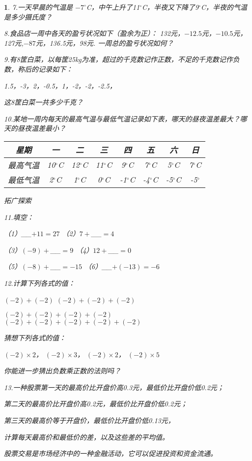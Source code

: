 \documentclass{article}
\newtheorem{exercise}{ }
\begin{document}
\begin{exercise}
7.一天早晨的气温是 ${-7}^\circ$C，中午上升了11$^\circ$C，半夜又下降了9$^\circ$C，半夜的气温是多少摄氏度？

8.食品店一周中各天的盈亏状况如下（盈余为正）：
	132元，${-12.5}$元，${-10.5}$元，127元,${-87}$元，136.5元，98元.
一周总的盈亏状况如何？

9.有8筐白菜，以每筐25kg为准，超过的千克数记作正数，不足的千克数记作负数，称后的记录如下：

1.5，-3，2，-0.5，1，-2，-2，-2.5，

这8筐白菜一共多少千克？

10.某地一周内每天的最高气温与最低气温记录如下表，哪天的昼夜温差最大？哪天的昼夜温差最小？

\begin{tabular}{|c|c|c|c|c|c|c|c|}
     \hline
     星期&一&二&三&四&五&六&日\\
     \hline
     最高气温&10$^\circ$C&12$^\circ$C&11$^\circ$C&9$^\circ$C&7$^\circ$C&5$^\circ$C&7$^\circ$C\\
     \hline
     最低气温&2$^\circ$C&1$^\circ$C&0$^\circ$C&-1$^\circ$C&-4$^\circ$C&-5$^\circ$C&-5$^\circ$\\
     \hline
\end{tabular}

拓广探索

11.填空：

    （1）__$+11=27$          （2）$7+$__$=4$

    （3）$(-9)+$__$=9$       （4）$12+$__$=0$
    
    （5）$(-8)+$__$=-15$     （6）__$+(-13)=-6$
    
12.计算下列各式的值：

    $(-2)+(-2)$                 $(-2)+(-2)+(-2)$
    
    $(-2)+(-2)+(-2)+(-2)$       $(-2)+(-2)+(-2)+(-2)+(-2)$
    
猜想下列各式的值：

    ${(-2)}\times 2$， ${(-2)}\times 3$， ${(-2)}\times 2$， ${(-2)}\times 5$
    
你能进一步猜出负数乘正数的法则吗？

13.一种股票第一天的最高价比开盘价高0.3元，最低价比开盘价低0.2元；

第二天的最高价比开盘价高0.2元，最低价比开盘价低0.2元；

第三天的最高价等于开盘价，最低价比开盘价低0.13元，

计算每天最高价和最低价的差，以及这些差的平均值。

股票交易是市场经济中的一种金融活动，它可以促进投资和资金流通。
\end{exercise}
\end{document}
